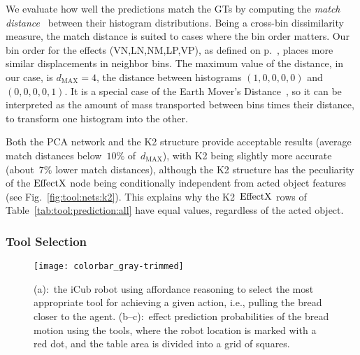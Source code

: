 We evaluate how well the predictions match the \acp{GT} by computing the \emph{match distance}~\cite{rubner:2000:earth} between their histogram distributions.
Being a cross-bin dissimilarity measure, the match distance is suited to cases where the bin order matters.
Our bin order for the effects (VN,LN,NM,LP,VP), as defined on p.~\pageref{para:effects}, places more similar displacements in neighbor bins.
The maximum value of the distance, in our case, is $d_{\text{MAX}}=4$, the distance between histograms $(1,0,0,0,0)$ and $(0,0,0,0,1)$.
It is a special case of the Earth Mover's Distance~\cite{rubner:2000:earth}, so it can be interpreted as the amount of mass transported between bins times their distance, to transform one histogram into the other.

Both the \ac{PCA} network and the K2 structure provide acceptable results (average match distances below~$10\%$ of~$d_{\text{MAX}}$), with K2 being slightly more accurate (about~$7\%$ lower match distances), although the K2 structure has the peculiarity of the $\text{EffectX}$ node being conditionally independent from acted object features (see Fig.~\ref{fig:tool:nets:k2}).
This explains why the K2~$\text{EffectX}$ rows of Table~\ref{tab:tool:prediction:all} have equal values, regardless of the acted object.

\subsubsection{Tool Selection}
\label{sec:tool:results:bns:tool_selection}

\begin{figure}
\centering
{} \quad
%
 \quad
%
 \quad
%
\subfloat
{\texttt{[image: colorbar\_gray-trimmed]} }
\caption[The iCub robot using affordance reasoning to select the most appropriate tool for achieving a given action.]{(a):~the iCub robot using affordance reasoning to select the most appropriate tool for achieving a given action, i.e., pulling the bread closer to the agent.
(b--c):~effect prediction probabilities of the bread motion using the tools, where the robot location is marked with a red dot, and the table area is divided into a grid of squares.}
\label{fig:iCub_selecting_between_two_tools}
\end{figure}

